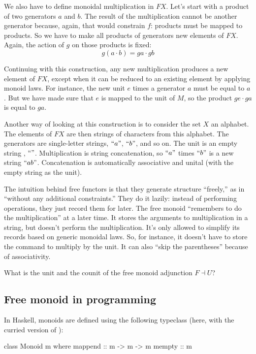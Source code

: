 \documentclass[DaoFP]{subfiles}
\begin{document}
We also have to define monoidal multiplication in $F X$. Let's start with a product of two generators $a$ and $b$. The result of the multiplication cannot be another generator because, again, that would constrain $f$: products must be mapped to products. So we have to make all products of generators new elements of $F X$. Again, the action of $g$ on those products is fixed:
\[ g (a \cdot b)  = g a \cdot g b\]

Continuing with this construction, any new multiplication produces a new element of $F X$, except when it can be reduced to an existing element by applying monoid laws. For instance, the new unit $e$ times a generator $a$ must be equal to $a$. But we have made sure that $e$ is mapped to the unit of $M$, so the product $g e \cdot g a$ is equal to $g a$.

Another way of looking at this construction is to consider the set $X$ an alphabet. The elements of $FX$ are then strings of characters from this alphabet. The generators are single-letter strings, $``a"$, $``b"$, and so on. The unit is an empty string , $``"$. Multiplication is string concatenation, so  $``a"$ times $``b"$ is a new string  $``ab"$. Concatenation is automatically associative and unital (with the empty string as the unit).

The intuition behind free functors is that they generate structure ``freely,'' as in ``without any additional constraints.'' They do it lazily: instead of performing operations, they just record them for later. The free monoid ``remembers to do the multiplication'' at a later time. It stores the arguments to multiplication in a string, but doesn't perform the multiplication. It's only allowed to simplify its records based on generic monoidal laws. So, for instance, it doesn't have to store the command to multiply by the unit. It can also ``skip the parentheses'' because of associativity. 

\begin{exercise}
What is the unit and the counit of the free monoid adjunction $F \dashv U$?
\end{exercise}

\subsection{Free monoid in programming}

In Haskell, monoids are defined using the following typeclass (here, with the curried version of ):
\begin{haskell}
class Monoid m where
  mappend :: m -> m -> m
  mempty  :: m
\end{haskell}
\end{document}
